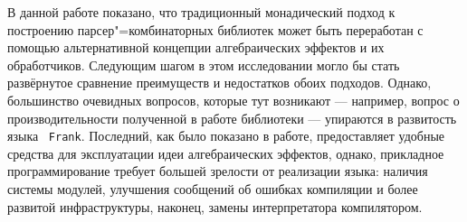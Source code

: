 \documentclass [a4paper] {article}
\begin{document}
В данной работе показано, что традиционный монадический подход к построению парсер"=комбинаторных библиотек может быть переработан с помощью альтернативной концепции алгебраических эффектов и их обработчиков. Следующим шагом в этом исследовании могло бы стать развёрнутое сравнение преимуществ и недостатков обоих подходов. Однако, большинство очевидных вопросов, которые тут возникают --- например, вопрос о производительности полученной в работе библиотеки --- упираются в развитость языка ~\texttt{Frank}. Последний, как было показано в работе, предоставляет удобные средства для эксплуатации
идеи алгебраических эффектов, однако, прикладное программирование требует большей
зрелости от реализации языка: наличия системы модулей, улучшения сообщений об
ошибках компиляции и более развитой инфраструктуры, наконец, замены интерпретатора компилятором.


{}

\end{document}
